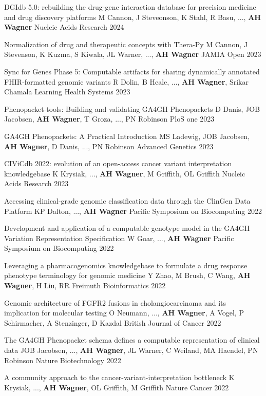 \pub
{DGIdb 5.0: rebuilding the drug-gene interaction database for precision medicine and drug discovery platforms}
{M Cannon, J Steveonson, K Stahl, R Basu, ..., {\bf AH Wagner}}
{Nucleic Acids Research}
{2024}

\pub
{Normalization of drug and therapeutic concepts with Thera-Py}
{M Cannon, J Stevenson, K Kuzma, S Kiwala, JL Warner, ..., {\bf AH Wagner}}
{JAMIA Open}
{2023}

\pub
{Sync for Genes Phase 5: Computable artifacts for sharing dynamically annotated FHIR‐formatted genomic variants}
{R Dolin, B Heale, ..., {\bf AH Wagner}, Srikar Chamala}
{Learning Health Systems}
{2023}

\pub
{Phenopacket-tools: Building and validating GA4GH Phenopackets}
{D Danis, JOB Jacobsen, {\bf AH Wagner}, T Groza, ..., PN Robinson}
{PloS one}
{2023}

\pub
{GA4GH Phenopackets: A Practical Introduction}
{MS Ladewig, JOB Jacobsen, {\bf AH Wagner}, D Danis, ..., PN Robinson}
{Advanced Genetics}
{2023}

\pub
{CIViCdb 2022: evolution of an open-access cancer variant interpretation knowledgebase}
{K Krysiak, ..., {\bf AH Wagner}, M Griffith, OL Griffith}
{Nucleic Acids Research}
{2023}

\pub
{Accessing clinical-grade genomic classification data through the ClinGen Data Platform}
{KP Dalton, ..., {\bf AH Wagner}}
{Pacific Symposium on Biocomputing}
{2022}

\pub
{Development and application of a computable genotype model in the GA4GH Variation Representation Specification}
{W Goar, ..., {\bf AH Wagner}}
{Pacific Symposium on Biocomputing}
{2022}

\pub
{Leveraging a pharmacogenomics knowledgebase to formulate a drug response phenotype terminology for genomic medicine}
{Y Zhao, M Brush, C Wang,  {\bf AH Wagner}, H Liu, RR Freimuth}
{Bioinformatics}
{2022}

\pub
{Genomic architecture of FGFR2 fusions in cholangiocarcinoma and its implication for molecular testing}
{O Neumann, ..., {\bf AH Wagner}, A Vogel, P Schirmacher, A Stenzinger, D Kazdal}
{British Journal of Cancer}
{2022}

\pub
{The GA4GH Phenopacket schema defines a computable representation of clinical data}
{JOB Jacobsen, ..., {\bf AH Wagner}, JL Warner, C Weiland, MA Haendel, PN Robinson}
{Nature Biotechnology}
{2022}

\pub
{A community approach to the cancer-variant-interpretation bottleneck}
{K Krysiak, ..., {\bf AH Wagner}, OL Griffith, M Griffith}
{Nature Cancer}
{2022}


